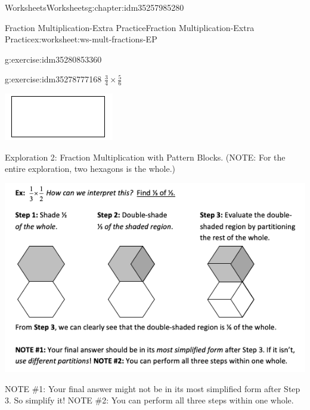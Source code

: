\documentclass[twoside,11pt,]{book}
\begin{document}
\begin{chapterptx}{Worksheets}{}{Worksheets}{}{}{g:chapter:idm35257985280}
\begin{worksheet-section-numberless}{Fraction Multiplication-Extra Practice}{}{Fraction Multiplication-Extra Practice}{}{}{x:worksheet:ws-mult-fractions-EP}
\begin{divisionexercise}{1}{}{}{g:exercise:idm35280853360}
\end{divisionexercise}%
\clearpage
\begin{divisionexercise}{2}{}{}{g:exercise:idm35278777168}%
\(\frac{3}{4} \times \frac{5}{6} \)%
\begin{sidebyside}{1}{0.2}{0.2}{0}%
\begin{sbspanel}{0.6}%
\includegraphics[width=1\linewidth]{images/generic-rectangle.png}
\end{sbspanel}%
\end{sidebyside}%
\end{divisionexercise}%
\clearpage
\begin{introduction}{}%
Exploration 2: Fraction Multiplication with Pattern Blocks. (NOTE: For the entire exploration, two hexagons is the whole.)%
\begin{sidebyside}{1}{0}{0}{0}%
\begin{sbspanel}{1}%
\includegraphics[width=1\linewidth]{images/frac-mult-pattern.png}
\end{sbspanel}%
\end{sidebyside}%
\par
NOTE \#1: Your final answer might not be in its most simplified form after Step 3. So simplify it! NOTE \#2: You can perform all three steps within one whole.%

\end{introduction}
\end{worksheet-section-numberless}
\end{chapterptx}
\end{document}
